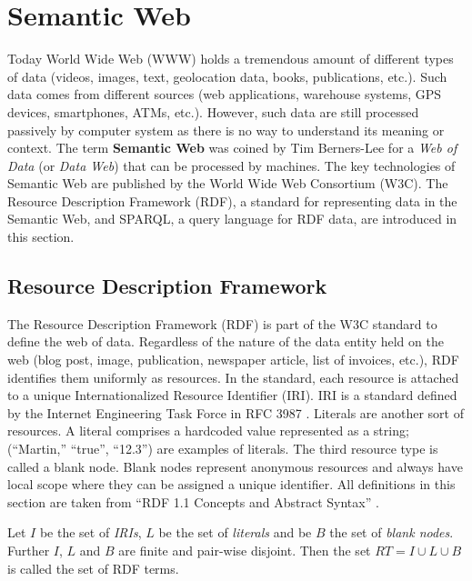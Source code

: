 \section{Semantic Web}
\label{sec:preliminaries:semanticweb}

Today World Wide Web (WWW) holds a tremendous amount of different types of data (videos, images, text, geolocation data, books, publications, etc.). 
Such data comes from different sources (web applications, warehouse systems, GPS devices, smartphones, ATMs, etc.).
However, such data are still processed passively by computer system as there is no way to understand its meaning or context.
The term \textbf{Semantic Web} was coined by Tim Berners-Lee for a \textit{Web of Data} (or \textit{Data Web}) \cite{LeeWeavingTheWeb} that can be processed by machines. 
The key technologies of Semantic Web are published by the World Wide Web Consortium (W3C). 
The Resource Description Framework (RDF), a standard for representing data in the Semantic Web, and SPARQL, a query language for RDF data, are introduced in this section.

\subsection{Resource Description Framework}
\label{sec:rdf}
The Resource Description Framework (RDF) \cite{rdfonline} is part of the W3C standard to define the web of data. Regardless of the nature of the data entity held on the web (blog post, image, publication, newspaper article,  list of invoices, etc.), RDF identifies them uniformly as resources. In the standard, each resource is attached to a unique Internationalized Resource Identifier (IRI). IRI is a standard defined by the Internet Engineering Task Force in RFC 3987 \cite{rfc3987}. Literals are another sort of resources. A literal comprises a hardcoded value represented as a string; (“Martin,” “true”, “12.3”) are examples of literals. The third resource type is called a blank node. Blank nodes represent anonymous resources and always have local scope where they can be assigned a unique identifier. All definitions in this section are taken from “RDF 1.1 Concepts and Abstract Syntax” \cite{RDF11}. \\

\begin{definition}
Let $I$ be the set of \textit{IRIs}, $L$ be the set of \textit{literals} and be $B$ the set of
\textit{blank nodes}. Further $I$, $L$ and $B$ are finite and pair-wise disjoint. Then the set $RT = I \cup L \cup B$ is called the set of RDF terms. 
\end{definition}

